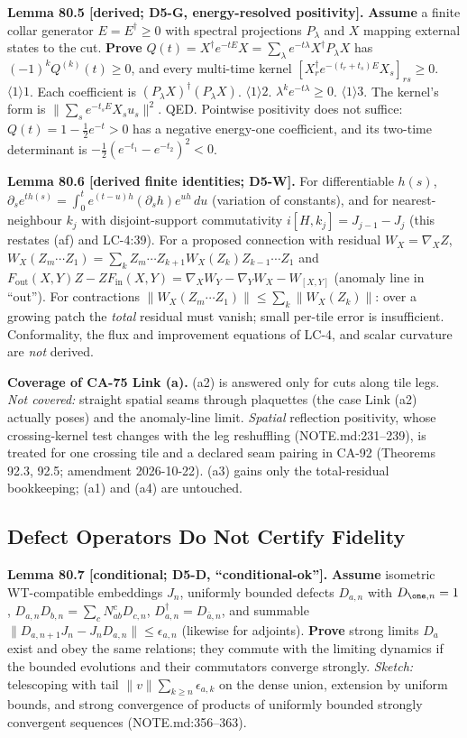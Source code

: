 \textbf{Lemma 80.5 [derived; D5-G, energy-resolved positivity].}  \textbf{Assume} a finite collar generator
\(E=E^\dagger\ge0\) with spectral projections \(P_\lambda\) and \(X\) mapping external states to the cut.
\textbf{Prove} \(Q(t)=X^\dagger e^{-tE}X=\sum_\lambda e^{-t\lambda}X^\dagger P_\lambda X\) has
\((-1)^kQ^{(k)}(t)\ge0\), and every multi-time kernel \([X_r^\dagger e^{-(t_r+t_s)E}X_s]_{rs}\ge0\).
\(\langle1\rangle1\). Each coefficient is \((P_\lambda X)^\dagger(P_\lambda X)\).  \(\langle1\rangle2\).
\(\lambda^ke^{-t\lambda}\ge0\).  \(\langle1\rangle3\). The kernel's form is \(\|\sum_se^{-t_sE}X_su_s\|^2\).  QED.
Pointwise positivity does not suffice: \(Q(t)=1-\tfrac12e^{-t}>0\) has a negative energy-one coefficient,
and its two-time determinant is \(-\tfrac12(e^{-t_1}-e^{-t_2})^2<0\).

\textbf{Lemma 80.6 [derived finite identities; D5-W].}  For differentiable \(h(s)\),
\(\partial_se^{th(s)}=\int_0^te^{(t-u)h}(\partial_sh)e^{uh}\,du\) (variation of constants), and for
nearest-neighbour \(k_j\) with disjoint-support commutativity
\(i[H,k_j]=J_{j-1}-J_j\) (this restates (af) and LC-4:39).  For a proposed connection with residual
\(W_X=\nabla_XZ\), \(W_X(Z_m\cdots Z_1)=\sum_kZ_m\cdots Z_{k+1}W_X(Z_k)Z_{k-1}\cdots Z_1\) and
\(F_{\mathrm{out}}(X,Y)Z-ZF_{\mathrm{in}}(X,Y)=\nabla_XW_Y-\nabla_YW_X-W_{[X,Y]}\) (anomaly line in
``out'').  For contractions \(\|W_X(Z_m\cdots Z_1)\|\le\sum_k\|W_X(Z_k)\|\): over a growing patch the
\emph{total} residual must vanish; small per-tile error is insufficient.  Conformality, the flux and
improvement equations of LC-4, and scalar curvature are \emph{not} derived.

\textbf{Coverage of CA-75 Link (a).}  (a2) is answered only for cuts along tile legs.  \emph{Not covered:}
straight spatial seams through plaquettes (the case Link (a2) actually poses) and the anomaly-line limit.
\emph{Spatial} reflection positivity, whose crossing-kernel test changes with the leg reshuffling (NOTE.md:231--239), is
treated for one crossing tile and a declared seam pairing in CA-92 (Theorems 92.3, 92.5; amendment 2026-10-22).  (a3) gains only the total-residual bookkeeping; (a1) and (a4) are untouched.

\subsection{Defect Operators Do Not Certify Fidelity}

\textbf{Lemma 80.7 [conditional; D5-D, ``conditional-ok''].}  \textbf{Assume} isometric WT-compatible
embeddings \(J_n\), uniformly bounded defects \(D_{a,n}\) with \(D_{\one,n}=1\),
\(D_{a,n}D_{b,n}=\sum_cN_{ab}^cD_{c,n}\), \(D_{a,n}^\dagger=D_{\bar a,n}\), and summable
\(\|D_{a,n+1}J_n-J_nD_{a,n}\|\le\epsilon_{a,n}\) (likewise for adjoints).  \textbf{Prove} strong limits
\(D_a\) exist and obey the same relations; they commute with the limiting dynamics if the bounded
evolutions and their commutators converge strongly.  \emph{Sketch:} telescoping with tail
\(\|v\|\sum_{k\ge n}\epsilon_{a,k}\) on the dense union, extension by uniform bounds, and strong convergence
of products of uniformly bounded strongly convergent sequences (NOTE.md:356--363).

